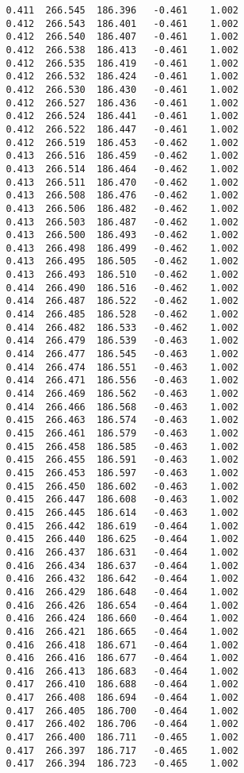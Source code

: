 \begin{verbatim}
   0.411  266.545  186.396   -0.461    1.002
   0.412  266.543  186.401   -0.461    1.002
   0.412  266.540  186.407   -0.461    1.002
   0.412  266.538  186.413   -0.461    1.002
   0.412  266.535  186.419   -0.461    1.002
   0.412  266.532  186.424   -0.461    1.002
   0.412  266.530  186.430   -0.461    1.002
   0.412  266.527  186.436   -0.461    1.002
   0.412  266.524  186.441   -0.461    1.002
   0.412  266.522  186.447   -0.461    1.002
   0.412  266.519  186.453   -0.462    1.002
   0.413  266.516  186.459   -0.462    1.002
   0.413  266.514  186.464   -0.462    1.002
   0.413  266.511  186.470   -0.462    1.002
   0.413  266.508  186.476   -0.462    1.002
   0.413  266.506  186.482   -0.462    1.002
   0.413  266.503  186.487   -0.462    1.002
   0.413  266.500  186.493   -0.462    1.002
   0.413  266.498  186.499   -0.462    1.002
   0.413  266.495  186.505   -0.462    1.002
   0.413  266.493  186.510   -0.462    1.002
   0.414  266.490  186.516   -0.462    1.002
   0.414  266.487  186.522   -0.462    1.002
   0.414  266.485  186.528   -0.462    1.002
   0.414  266.482  186.533   -0.462    1.002
   0.414  266.479  186.539   -0.463    1.002
   0.414  266.477  186.545   -0.463    1.002
   0.414  266.474  186.551   -0.463    1.002
   0.414  266.471  186.556   -0.463    1.002
   0.414  266.469  186.562   -0.463    1.002
   0.414  266.466  186.568   -0.463    1.002
   0.415  266.463  186.574   -0.463    1.002
   0.415  266.461  186.579   -0.463    1.002
   0.415  266.458  186.585   -0.463    1.002
   0.415  266.455  186.591   -0.463    1.002
   0.415  266.453  186.597   -0.463    1.002
   0.415  266.450  186.602   -0.463    1.002
   0.415  266.447  186.608   -0.463    1.002
   0.415  266.445  186.614   -0.463    1.002
   0.415  266.442  186.619   -0.464    1.002
   0.415  266.440  186.625   -0.464    1.002
   0.416  266.437  186.631   -0.464    1.002
   0.416  266.434  186.637   -0.464    1.002
   0.416  266.432  186.642   -0.464    1.002
   0.416  266.429  186.648   -0.464    1.002
   0.416  266.426  186.654   -0.464    1.002
   0.416  266.424  186.660   -0.464    1.002
   0.416  266.421  186.665   -0.464    1.002
   0.416  266.418  186.671   -0.464    1.002
   0.416  266.416  186.677   -0.464    1.002
   0.416  266.413  186.683   -0.464    1.002
   0.417  266.410  186.688   -0.464    1.002
   0.417  266.408  186.694   -0.464    1.002
   0.417  266.405  186.700   -0.464    1.002
   0.417  266.402  186.706   -0.464    1.002
   0.417  266.400  186.711   -0.465    1.002
   0.417  266.397  186.717   -0.465    1.002
   0.417  266.394  186.723   -0.465    1.002

\end{verbatim}
